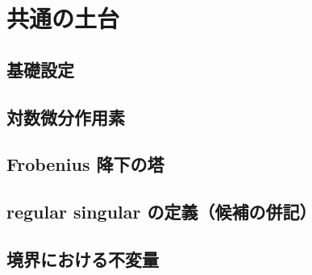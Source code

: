 
\section{共通の土台}

\subsection{基礎設定}

\subsection{対数微分作用素}

\subsection{Frobenius 降下の塔}

\subsection{regular singular の定義（候補の併記）}

\subsection{境界における不変量}
